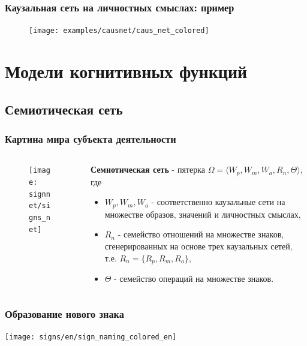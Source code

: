 \documentclass[default]{beamer}
\begin{document}
	\begin{frame}
		\frametitle{Каузальная сеть на личностных смыслах: пример}
		
		\begin{figure}
			\texttt{[image: examples/causnet/caus\_net\_colored]}
		\end{figure}
		
	\end{frame}	

	\section{Модели когнитивных функций}
	\subsection{Семиотическая сеть}
	\begin{frame}
		\frametitle{Картина мира субъекта деятельности}
		
		\begin{columns}
			\begin{column}{0.55\textwidth}
				\begin{figure}
					\texttt{[image: signnet/signs\_net]}
				\end{figure}
			\end{column}
			\begin{column}{0.45\textwidth}
				\textbf{Семиотическая сеть} - пятерка $\Omega=\langle W_p, W_m, W_a, R_n, \Theta \rangle$, где
				\begin{itemize}
					\item $W_p, W_m, W_a$ - соответственно каузальные сети на множестве образов, значений и личностных смыслах,
					\item $R_n$ - семейство отношений на множестве знаков, сгенерированных на основе трех каузальных сетей, т.е. $R_n=\{R_p, R_m, R_a\}$,
					\item $\Theta$ - семейство операций на множестве знаков.
				\end{itemize}
			\end{column}
		\end{columns}
		\nocite{*}
		\printbibliography[keyword={symbsign}, resetnumbers=true]
	\end{frame}	
	
	\begin{frame}
		\frametitle{Образование нового знака}
		\centering
		\texttt{[image: signs/en/sign\_naming\_colored\_en]}
	\end{frame}		
	
\end{document}
